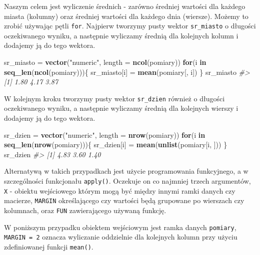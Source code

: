 \documentclass[paper=6in:9in,pagesize=pdftex,headinclude=on,footinclude=on,10pt]{scrbook}
\newenvironment{Shaded}{\begin{snugshade}}{\end{snugshade}}
\newcommand{\CommentTok}[1]{\textcolor[rgb]{0.56,0.35,0.01}{\textit{#1}}}
\newcommand{\ControlFlowTok}[1]{\textcolor[rgb]{0.13,0.29,0.53}{\textbf{#1}}}
\newcommand{\DataTypeTok}[1]{\textcolor[rgb]{0.13,0.29,0.53}{#1}}
\newcommand{\KeywordTok}[1]{\textcolor[rgb]{0.13,0.29,0.53}{\textbf{#1}}}
\newcommand{\NormalTok}[1]{#1}
\newcommand{\StringTok}[1]{\textcolor[rgb]{0.31,0.60,0.02}{#1}}
\begin{document}
Naszym celem jest wyliczenie średnich - zarówno średniej wartości dla każdego miasta (kolumny) oraz średniej wartości dla każdego dnia (wiersze).
Możemy to zrobić używając pętli \texttt{for}.
Najpierw tworzymy pusty wektor \texttt{sr\_miasto} o długości oczekiwanego wyniku, a następnie wyliczamy średnią dla kolejnych kolumn i dodajemy ją do tego wektora.

\begin{Shaded}
\begin{Highlighting}[]
\NormalTok{sr_miasto =}\StringTok{ }\KeywordTok{vector}\NormalTok{(}\StringTok{"numeric"}\NormalTok{, }\DataTypeTok{length =} \KeywordTok{ncol}\NormalTok{(pomiary))}
\ControlFlowTok{for}\NormalTok{(i }\ControlFlowTok{in} \KeywordTok{seq_len}\NormalTok{(}\KeywordTok{ncol}\NormalTok{(pomiary)))\{}
\NormalTok{  sr_miasto[i] =}\StringTok{ }\KeywordTok{mean}\NormalTok{(pomiary[, i])}
\NormalTok{\}}
\NormalTok{sr_miasto}
\CommentTok{#> [1] 1.80 4.17 3.87}
\end{Highlighting}
\end{Shaded}

W kolejnym kroku tworzymy pusty wektor \texttt{sr\_dzien} również o długości oczekiwanego wyniku, a następnie wyliczamy średnią dla kolejnych wierszy i dodajemy ją do tego wektora.

\begin{Shaded}
\begin{Highlighting}[]
\NormalTok{sr_dzien =}\StringTok{ }\KeywordTok{vector}\NormalTok{(}\StringTok{"numeric"}\NormalTok{, }\DataTypeTok{length =} \KeywordTok{nrow}\NormalTok{(pomiary))}
\ControlFlowTok{for}\NormalTok{(i }\ControlFlowTok{in} \KeywordTok{seq_len}\NormalTok{(}\KeywordTok{nrow}\NormalTok{(pomiary)))\{}
\NormalTok{  sr_dzien[i] =}\StringTok{ }\KeywordTok{mean}\NormalTok{(}\KeywordTok{unlist}\NormalTok{(pomiary[i, ]))}
\NormalTok{\}}
\NormalTok{sr_dzien}
\CommentTok{#> [1] 4.83 3.60 1.40}
\end{Highlighting}
\end{Shaded}

Alternatywą w takich przypadkach jest użycie programowania funkcyjnego, a w szczególności funkcjonału \texttt{apply()}.
Oczekuje on co najmniej trzech argumentów, \texttt{X} - obiektu wejściowego którym mogą być między innymi ramki danych czy macierze, \texttt{MARGIN} określającego czy wartości będą grupowane po wierszach czy kolumnach, oraz \texttt{FUN} zawierającego używaną funkcję.

W poniższym przypadku obiektem wejściowym jest ramka danych \texttt{pomiary}, \texttt{MARGIN\ =\ 2} oznacza wyliczanie oddzielnie dla kolejnych kolumn przy użyciu zdefiniowanej funkcji \texttt{mean()}.
\end{document}
